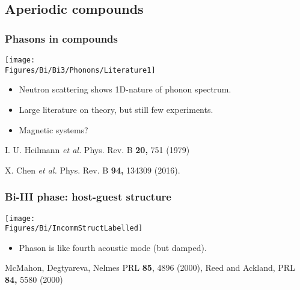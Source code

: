 
\subsection{Aperiodic compounds}
\begin{frame}
\frametitle{Phasons in compounds}
\centerline{\texttt{[image: \\Figures/Bi/Bi3/Phonons/Literature1]}}

\vspace{1.5em}
\begin{itemize}
\item
Neutron scattering shows 1D-nature of phonon spectrum.
\item
Large literature on theory, but still few experiments.
\item
Magnetic systems?
\end{itemize}

\vspace*{\fill}
\vspace{0.5em}
\centerline{\makebox[\linewidth]{\rule{0.85\textwidth}{0.4pt}}}
\centerline{\scriptsize I. U. Heilmann  {\it et al.} Phys. Rev. B {\bf
    20,} 751 (1979)}
\centerline{\scriptsize X. Chen {\it et al.} Phys. Rev. B {\bf 94,} 134309 (2016).}
\end{frame}




\begin{frame}[label=BiIntro]
\frametitle{Bi-III phase: host-guest structure}
\centerline{\texttt{[image: \\Figures/Bi/IncommStructLabelled]}}
\begin{itemize}
\item <visible@2->Phason is like fourth acoustic mode (but damped).


\end{itemize}

\vspace*{\fill}
\vspace{1.5em}
\centerline{\makebox[\linewidth]{\rule{0.85\textwidth}{0.4pt}}}
\centerline{\scriptsize McMahon, Degtyareva, Nelmes PRL {\bf 85}, 4896
  (2000), Reed and Ackland, PRL {\bf 84,} 5580 (2000)}
\end{frame}


